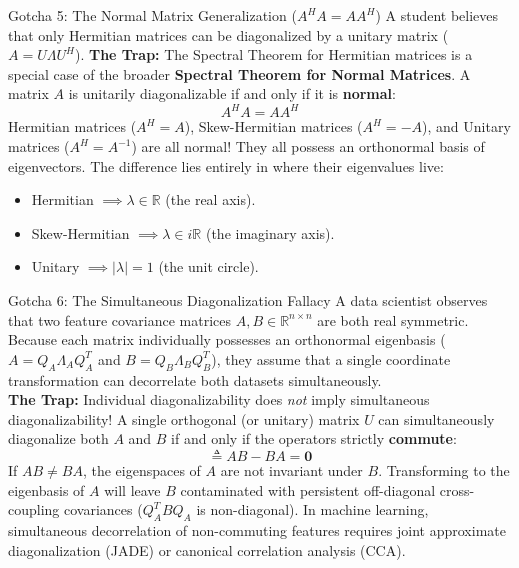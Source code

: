 \begin{trapbox}{Gotcha 5: The Normal Matrix Generalization ($A^H A = A A^H$)}
A student believes that only Hermitian matrices can be diagonalized by a unitary matrix ($A = U \Lambda U^H$).
\textbf{The Trap:} The Spectral Theorem for Hermitian matrices is a special case of the broader \textbf{Spectral Theorem for Normal Matrices}. A matrix $A$ is unitarily diagonalizable if and only if it is \textbf{normal}:
\begin{equation*}
A^H A = A A^H
\end{equation*}
Hermitian matrices ($A^H = A$), Skew-Hermitian matrices ($A^H = -A$), and Unitary matrices ($A^H = A^{-1}$) are all normal! They all possess an orthonormal basis of eigenvectors. The difference lies entirely in where their eigenvalues live:
\begin{itemize}
    \item Hermitian $\implies \lambda \in \mathbb{R}$ (the real axis).
    \item Skew-Hermitian $\implies \lambda \in i\mathbb{R}$ (the imaginary axis).
    \item Unitary $\implies |\lambda| = 1$ (the unit circle).
\end{itemize}
\end{trapbox}

\begin{trapbox}{Gotcha 6: The Simultaneous Diagonalization Fallacy}
A data scientist observes that two feature covariance matrices $A, B \in \mathbb{R}^{n \times n}$ are both real symmetric. Because each matrix individually possesses an orthonormal eigenbasis ($A = Q_A \Lambda_A Q_A^T$ and $B = Q_B \Lambda_B Q_B^T$), they assume that a single coordinate transformation can decorrelate both datasets simultaneously. \\
\textbf{The Trap:} Individual diagonalizability does \emph{not} imply simultaneous diagonalizability! A single orthogonal (or unitary) matrix $U$ can simultaneously diagonalize both $A$ and $B$ if and only if the operators strictly \textbf{commute}:
\begin{equation*}
[A, B] \triangleq AB - BA = \mathbf{0}
\end{equation*}
If $AB \ne BA$, the eigenspaces of $A$ are not invariant under $B$. Transforming to the eigenbasis of $A$ will leave $B$ contaminated with persistent off-diagonal cross-coupling covariances ($Q_A^T B Q_A$ is non-diagonal). In machine learning, simultaneous decorrelation of non-commuting features requires joint approximate diagonalization (JADE) or canonical correlation analysis (CCA).
\end{trapbox}

